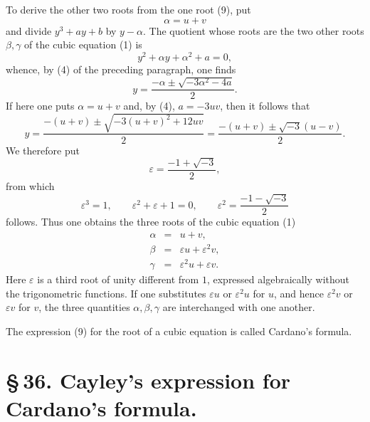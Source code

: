 \documentclass[11pt]{article}
\begin{document}
To derive the other two roots from the one root (9), put
\[
 \alpha=u+v
\]
and divide $y^3+ay+b$ by $y-\alpha$. The quotient whose roots are the two other roots $\beta,\gamma$ of the cubic equation (1) is
\[
 y^2+\alpha y+\alpha^2+a=0,
\]
whence, by (4) of the preceding paragraph, one finds
\[
 y=\frac{-\alpha\pm\sqrt{-3\alpha^2-4a}}{2}.
\]
If here one puts $\alpha=u+v$ and, by (4), $a=-3uv$, then it follows that
\[
 y=\frac{-(u+v)\pm\sqrt{-3(u+v)^2+12uv}}{2}
  =\frac{-(u+v)\pm\sqrt{-3}(u-v)}{2}.
\]
We therefore put
\begin{equation}
\varepsilon=\frac{-1+\sqrt{-3}}{2},
\tag{11}
\end{equation}
from which
\begin{equation}
\varepsilon^3=1,\qquad \varepsilon^2+\varepsilon+1=0,
\qquad
\varepsilon^2=\frac{-1-\sqrt{-3}}{2}
\tag{12}
\end{equation}
follows. Thus one obtains the three roots of the cubic equation (1)
\begin{equation}
\begin{array}{rcl}
\alpha&=&u+v,\\
\beta&=&\varepsilon u+\varepsilon^2v,\\
\gamma&=&\varepsilon^2u+\varepsilon v.
\end{array}
\tag{13}
\end{equation}
Here $\varepsilon$ is a third root of unity different from $1$, expressed algebraically without the trigonometric functions. If one substitutes $\varepsilon u$ or $\varepsilon^2u$ for $u$, and hence $\varepsilon^2v$ or $\varepsilon v$ for $v$, the three quantities $\alpha,\beta,\gamma$ are interchanged with one another.

The expression (9) for the root of a cubic equation is called Cardano's formula.

\section*{\S\,36. Cayley's expression for Cardano's formula.}
\end{document}
